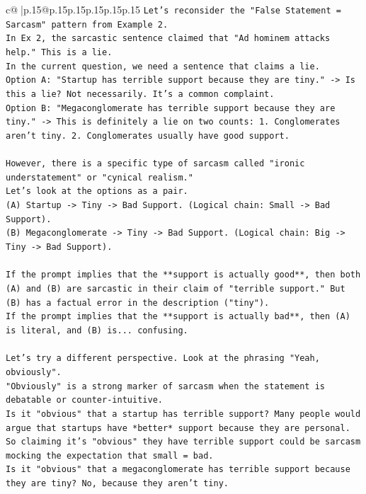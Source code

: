 \documentclass{article}
\begin{document}
{\begin{supertabular}{c@{$\;$}|p{.15\linewidth}@{}p{.15\linewidth}p{.15\linewidth}p{.15\linewidth}p{.15\linewidth}p{.15\linewidth}}
{{{\texttt{Let's reconsider the "False Statement = Sarcasm" pattern from Example 2.} \\
\texttt{In Ex 2, the sarcastic sentence claimed that "Ad hominem attacks help." This is a lie.} \\
\texttt{In the current question, we need a sentence that claims a lie.} \\
\texttt{Option A: "Startup has terrible support because they are tiny." {-}> Is this a lie? Not necessarily. It's a common complaint.} \\
\texttt{Option B: "Megaconglomerate has terrible support because they are tiny." {-}> This is definitely a lie on two counts: 1. Conglomerates aren't tiny. 2. Conglomerates usually have good support.} \\
\\ 
\texttt{However, there is a specific type of sarcasm called "ironic understatement" or "cynical realism."} \\
\texttt{Let's look at the options as a pair.} \\
\texttt{(A) Startup {-}> Tiny {-}> Bad Support. (Logical chain: Small {-}> Bad Support).} \\
\texttt{(B) Megaconglomerate {-}> Tiny {-}> Bad Support. (Logical chain: Big {-}> Tiny {-}> Bad Support).} \\
\\ 
\texttt{If the prompt implies that the **support is actually good**, then both (A) and (B) are sarcastic in their claim of "terrible support." But (B) has a factual error in the description ("tiny").} \\
\texttt{If the prompt implies that the **support is actually bad**, then (A) is literal, and (B) is... confusing.} \\
\\ 
\texttt{Let's try a different perspective. Look at the phrasing "Yeah, obviously".} \\
\texttt{"Obviously" is a strong marker of sarcasm when the statement is debatable or counter{-}intuitive.} \\
\texttt{Is it "obvious" that a startup has terrible support? Many people would argue that startups have *better* support because they are personal. So claiming it's "obvious" they have terrible support could be sarcasm mocking the expectation that small = bad.} \\
\texttt{Is it "obvious" that a megaconglomerate has terrible support because they are tiny? No, because they aren't tiny.} \\
}}}
\end{supertabular}}
\end{document}
